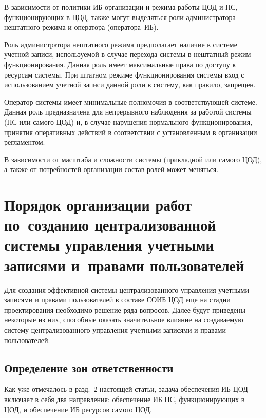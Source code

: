 \begin{multicols}{2}
{}
       
       В зависимости от политики ИБ организации и режима работы ЦОД и ПС, 
функционирующих в ЦОД, также могут выделяться роли администратора нештатного 
режима и оператора (оператора~ИБ).
{%

}

Роль администратора нештатного режима 
пред\-по\-ла\-га\-ет наличие в сис\-те\-ме учетной записи, ис\-поль\-зу\-емой 
в случае перехода сис\-те\-мы 
в нештатный \mbox{режим} функционирования. Данная роль имеет максимальные права по 
доступу к ресурсам сис\-те\-мы. При штатном режиме функционирования сис\-те\-мы вход с 
использованием учетной записи данной роли в сис\-те\-му, как правило, запрещен. 

Оператор 
сис\-те\-мы имеет минимальные полномочия в соответствующей сис\-те\-ме. Данная роль 
предназначена для непрерывного наблюдения за работой сис\-те\-мы (ПС или самого ЦОД) 
и, в случае нарушения нормального функционирования, принятия оперативных действий 
в соответствии с уста\-нов\-лен\-ным в организации регламентом.
       {

}

       В зависимости от масштаба и сложности сис\-те\-мы (прикладной или самого ЦОД), 
а также от потребностей организации состав ролей может меняться. 

\section{Порядок организации работ по~созданию централизованной 
системы управления учетными записями и~правами пользователей}
       
       Для создания эффективной сис\-те\-мы централизованного управления учетными 
записями и правами пользователей в составе СОИБ ЦОД еще на стадии проектирования 
необходимо решение ряда вопросов. Далее будут приведены некоторые из них, способные 
оказать значительное влияние на создаваемую сис\-те\-му централизованного управ\-ле\-ния 
учетными записями и правами пользователей.
{

}

\subsection{Определение зон ответственности}

       Как уже отмечалось в разд.~2 настоящей статьи, задача обеспечения ИБ ЦОД 
включает в себя два направления:
обеспечение ИБ ПС, функционирующих в ЦОД, и
обеспечение ИБ ресурсов самого ЦОД.



\end{multicols}
